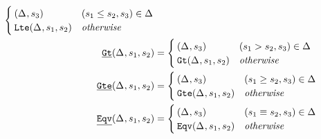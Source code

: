 \begin{align*}
                                     \begin{cases}
                                       \wrappedprimspacer
                                       (\aStore{},s_3) & (s_1 \leq s_2, s_3) \in \aStore{} \\
                                       \plte(\aStore{},s_1,s_2) & \mathit{otherwise}
                                     \end{cases} \\
  \pwrap{\pgt}(\aStore{},s_1,s_2) &=
                                     \begin{cases}
                                       \wrappedprimspacer
                                       (\aStore{},s_3) & (s_1 > s_2, s_3) \in \aStore{} \\
                                       \pgt(\aStore{},s_1,s_2) & \mathit{otherwise}
                                     \end{cases} \\
  \pwrap{\pgte}(\aStore{},s_1,s_2) &=
                                    \begin{cases}
                                      \wrappedprimspacer
                                      (\aStore{},s_3) & (s_1 \geq s_2, s_3) \in \aStore{} \\
                                      \pgte(\aStore{},s_1,s_2) & \mathit{otherwise}
                                    \end{cases} \\
  \pwrap{\peq}(\aStore{},s_1,s_2) &=
                                     \begin{cases}
                                       \wrappedprimspacer
                                       (\aStore{},s_3) & (s_1 \equiv s_2, s_3) \in \aStore{} \\
                                       \peq(\aStore{},s_1,s_2) & \mathit{otherwise}
                                     \end{cases} \\
\end{align*}
